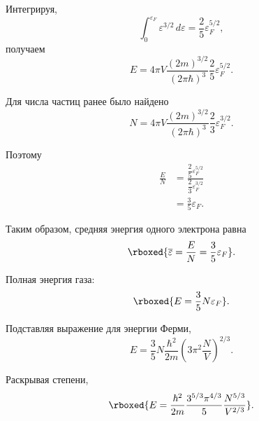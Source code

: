 \documentclass[../final.tex]{subfiles}
\begin{document}
Интегрируя,
%
\begin{equation*}
    \int_0^{\varepsilon_F}
    \varepsilon^{3/2}\,d\varepsilon
    =
    \frac{2}{5}
    \varepsilon_F^{5/2},
\end{equation*}
%
получаем
%
\begin{equation*}
    E
    =
    4\pi V
    \frac{
        (2m)^{3/2}
    }{
        (2\pi\hbar)^3
    }
    \frac{2}{5}
    \varepsilon_F^{5/2}.
\end{equation*}

Для числа частиц ранее было найдено
%
\begin{equation*}
    N
    =
    4\pi V
    \frac{
        (2m)^{3/2}
    }{
        (2\pi\hbar)^3
    }
    \frac{2}{3}
    \varepsilon_F^{3/2}.
\end{equation*}

Поэтому
%
\begin{align*}
    \frac{E}{N}
    &=
    \frac{
        \dfrac{2}{5}
        \varepsilon_F^{5/2}
    }{
        \dfrac{2}{3}
        \varepsilon_F^{3/2}
    }
    \\[5pt]
    &=
    \frac{3}{5}
    \varepsilon_F.
\end{align*}

Таким образом, средняя энергия одного электрона равна
%
\begin{equation*}
    \rboxed{
        \overline{\varepsilon}
        =
        \frac{E}{N}
        =
        \frac{3}{5}
        \varepsilon_F
    }.
\end{equation*}

Полная энергия газа:
%
\begin{equation*}
    \rboxed{
        E
        =
        \frac{3}{5}
        N\varepsilon_F
    }.
\end{equation*}

Подставляя выражение для энергии Ферми,
%
\begin{equation*}
    E
    =
    \frac{3}{5}
    N
    \frac{
        \hbar^2
    }{
        2m
    }
    \left(
        3\pi^2
        \frac{N}{V}
    \right)^{2/3}.
\end{equation*}

Раскрывая степени,
%
\begin{equation*}
    \rboxed{
        E
        =
        \frac{
            \hbar^2
        }{
            2m
        }
        \frac{
            3^{5/3}\pi^{4/3}
        }{
            5
        }
        \frac{
            N^{5/3}
        }{
            V^{2/3}
        }
    }.
\end{equation*}
\end{document}
